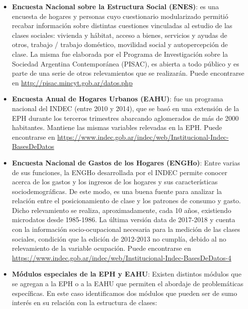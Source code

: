 \documentclass[
]{book}
\begin{document}
\begin{itemize}
\item
  \textbf{Encuesta Nacional sobre la Estructura Social (ENES)}: es una encuesta de hogares y personas cuyo cuestionario modularizado permitió recabar información sobre distintas cuestiones vinculadas al estudio de las clases sociales: vivienda y hábitat, acceso a bienes, servicios y ayudas de otros, trabajo / trabajo doméstico, movilidad social y autopercepción de clase. La misma fue elaborada por el Programa de Investigación sobre la Sociedad Argentina Contemporánea (PISAC), es abierta a todo público y es parte de una serie de otros relevamientos que se realizarán. Puede encontrarse en \url{http://pisac.mincyt.gob.ar/datos.php}
\item
  \textbf{Encuesta Anual de Hogares Urbanos (EAHU)}: fue un programa nacional del INDEC (entre 2010 y 2014), que se basó en una extensión de la EPH durante los terceros trimestres abarcando aglomerados de más de 2000 habitantes. Mantiene las mismas variables relevadas en la EPH. Puede encontrarse en \url{https://www.indec.gob.ar/indec/web/Institucional-Indec-BasesDeDatos}
\item
  \textbf{Encuesta Nacional de Gastos de los Hogares (ENGHo)}: Entre varias de sus funciones, la ENGHo desarrollada por el INDEC permite conocer acerca de los gastos y los ingresos de los hogares y sus características sociodemográficas. De este modo, es una buena fuente para analizar la relación entre el posicionamiento de clase y los patrones de consumo y gasto. Dicho relevamiento se realiza, aproximadamente, cada 10 años, existiendo microdatos desde 1985-1986. La última versión data de 2017-2018 y cuenta con la información socio-ocupacional necesaria para la medición de las clases sociales, condición que la edición de 2012-2013 no cumplía, debido al no relevamiento de la variable ocupación. Puede encontrarse en \url{https://www.indec.gob.ar/indec/web/Institucional-Indec-BasesDeDatos-4}
\item
  \textbf{Módulos especiales de la EPH y EAHU}: Existen distintos módulos que se agregan a la EPH o a la EAHU que permiten el abordaje de problemáticas específicas. En este caso identificamos dos módulos que pueden ser de sumo interés en su relación con la estructura de clases:


\end{itemize}
\end{document}

